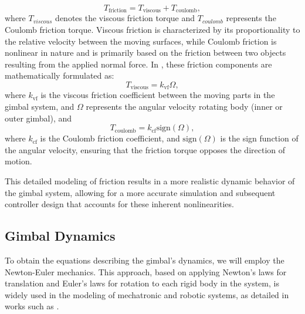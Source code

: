\begin{equation*}
T_{\text{friction}} = T_{\text{viscous}} + T_{\text{coulomb}},
\end{equation*}
where $T_{viscous}$ denotes the viscous friction torque and $T_{coulomb}$ represents the Coulomb friction torque. Viscous friction is characterized by its proportionality to the relative velocity between the moving surfaces, while Coulomb friction is nonlinear in nature and is primarily based on the friction between two objects resulting from the applied normal force. In , these friction components are mathematically formulated as:
    \begin{equation}
      \label{atritoviscoso}
    T_{\text{viscous}} = k_{\text{vf}} \Omega,
    \end{equation}
    where $k_{\text{vf}}$ is the viscous friction coefficient between the moving parts in the gimbal system, and ${\Omega}$ represents the angular velocity rotating body (inner or outer gimbal), and
    \begin{equation}
      \label{atritocoulomb}
    T_{\text{coulomb}} = k_{\text{cf}} \text{sign}(\Omega),
    \end{equation}
    where $k_{\text{cf}}$ is the Coulomb friction coefficient, and $\text{sign}(\Omega)$ is the sign function of the angular velocity, ensuring that the friction torque opposes the direction of motion.

This detailed modeling of friction results in a more realistic dynamic behavior of the gimbal system, allowing for a more accurate simulation and subsequent controller design that accounts for these inherent nonlinearities.

\subsection{Gimbal Dynamics}
\label{secaodinamicagimbal}
To obtain the equations describing the gimbal's dynamics, we will employ the Newton-Euler mechanics. This approach, based on applying Newton's laws for translation and Euler's laws for rotation to each rigid body in the system, is widely used in the modeling of mechatronic and robotic systems, as detailed in works such as .

